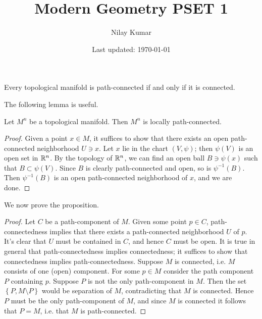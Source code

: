 \documentclass{../../mathnotes}
\title{Modern Geometry PSET 1}
\author{Nilay Kumar}
\date{Last updated: \today}
\begin{document}
\maketitle

\begin{prop}
    Every topological manifold is path-connected if and only if it is connected.
\end{prop}

The following lemma is useful.

\begin{lem}
    Let $M^n$ be a topological manifold. Then $M^n$ is locally path-connected.
\end{lem}
\begin{proof}
    Given a point $x\in M$, it suffices to show that there exists an open path-connected neighborhood $U\ni x$.
    Let $x$ lie in the chart $(V,\psi)$; then $\psi(V)$ is an open set in $\mathbb{R}^n$. By the topology of $\mathbb{R}^n$, we can
    find an open ball $B\ni\psi(x)$ such that $B\subset \psi(V)$. Since $B$ is clearly path-connected and open, so is $\psi^{-1}(B)$.
    Then $\psi^{-1}(B)$ is an open path-connected neighborhood of $x$, and we are done.
\end{proof}

We now prove the proposition.

\begin{proof}
    Let $C$ be a path-component of $M$. Given some point $p\in C$, path-connectedness implies that there exists a path-connected neighborhood
    $U$ of $p$. It's clear that $U$ must be contained in $C$, and hence $C$ must be open. It is true in general that path-connectedness
    implies connectedness; it suffices to show that connectedness implies path-connectedness. Suppose $M$ is connected, i.e. $M$ consists of
    one (open) component. For some $p\in M$ consider the path component $P$ containing $p$. Suppose $P$ is not the only path-component in $M$.
    Then the set $\left\{ P, M\setminus P \right\}$ would be separation of $M$, contradicting that $M$ is connected. Hence $P$ must be the only
    path-component of $M$, and since $M$ is connected it follows that $P=M$, i.e. that $M$ is path-connected.
\end{proof}
\end{document}
